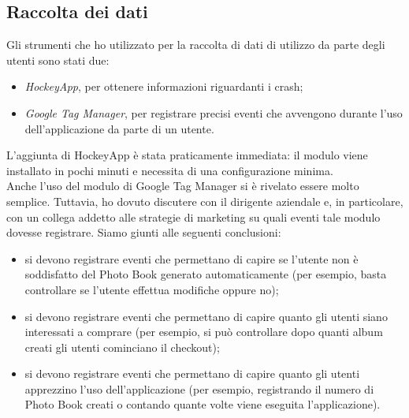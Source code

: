 		\subsection{Raccolta dei dati}
			Gli strumenti che ho utilizzato per la raccolta di dati di utilizzo da parte degli utenti sono stati due:
			\begin{itemize}
				\item \emph{HockeyApp}, per ottenere informazioni riguardanti i crash;
				\item \emph{Google Tag Manager}, per registrare precisi eventi che avvengono durante l'uso dell'applicazione da parte
				di un utente.
			\end{itemize}
			L'aggiunta di HockeyApp è stata praticamente immediata: il modulo viene installato in pochi minuti e necessita di una
			configurazione minima.\\
			Anche l'uso del modulo di Google Tag Manager si è rivelato essere molto semplice. Tuttavia, ho dovuto discutere con il
			dirigente aziendale e, in particolare, con un collega addetto alle strategie di marketing su quali eventi tale modulo dovesse
			registrare. Siamo giunti alle seguenti conclusioni:
			\begin{itemize}
				\item si devono registrare eventi che permettano di capire se l'utente non è soddisfatto del Photo Book generato
				automaticamente (per esempio, basta controllare se l'utente effettua modifiche oppure no);
				\item si devono registrare eventi che permettano di capire quanto gli utenti siano interessati a comprare (per
				esempio, si può controllare dopo quanti album creati gli utenti cominciano il checkout);
				\item si devono registrare eventi che permettano di capire quanto gli utenti apprezzino l'uso dell'applicazione
				(per esempio, registrando il numero di Photo Book creati o contando quante volte viene eseguita l'applicazione).
			\end{itemize}

